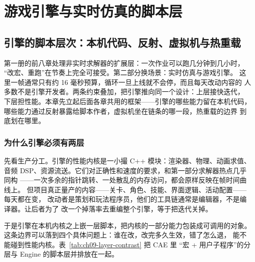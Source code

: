 \documentclass[12pt,a4paper,fontset=fandol]{ctexbook}
\newcommand{\Lang}[1]{\textsf{#1}}
\newcommand{\CPP}{\Lang{C++}}
\newcommand{\DomCAE}{\Lang{CAE}}
\newcommand{\DomEngine}{\Lang{Engine}}
\begin{document}
\part{游戏引擎与实时仿真的脚本层}

\chapter{引擎的脚本层次：本机代码、反射、虚拟机与热重载}
\label{ch:ch09-engine-layers}

第一册的前八章处理非实时求解器的扩展层：一次作业可以跑几分钟到几小时，
``改宏、重跑''在节奏上完全可接受。第二部分换场景：实时仿真与游戏引擎。
这里一帧通常只有约 16 毫秒预算，循环一旦上线就不会停，而且每天改动内容的
人多数不是引擎开发者。两条约束叠加，把引擎推向同一个设计：上层接快迭代，
下层担性能。本章先立起后面各章共用的框架——引擎的哪些能力留在本机代码，
哪些能力通过反射暴露给脚本作者，虚拟机坐在链条的哪一段，热重载的边界
到底划在哪里。

\section{为什么引擎必须有两层}
\label{sec:ch09-why-two-layers}

先看生产分工。引擎的性能内核是一小撮 \CPP{} 模块：渲染器、物理、动画求值、
音频 DSP、资源流送。它们对正确性和速度的要求，和第一部分求解器热点几乎同构
——一次多余的指针跳转、一处散乱的内存访问，都会原样反映在帧时间曲线上。
但项目真正量产的内容——关卡、角色、技能、界面逻辑、活动配置——每天都在变，
改动者是策划和玩法程序员，他们的工具链通常是编辑器，不是编译器。让后者为了
改一个掉落率去重编整个引擎，等于把迭代关掉。

于是引擎在本机内核之上嵌一层脚本，把内核的一部分能力包装成可调用的对象。
这条边界可以落到四个具体问题上：谁在改，改完多久生效，错了怎么退，
能不能碰到性能内核。表~\ref{tab:ch09-layer-contrast} 把 \DomCAE{} 里
``宏 + 用户子程序''的分层与 \DomEngine{} 的脚本层并排放在一起。
\end{document}

